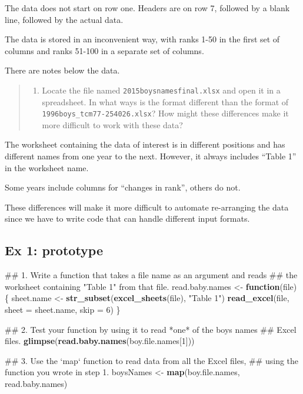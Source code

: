 \documentclass[]{book}
\newenvironment{Shaded}{\begin{snugshade}}{\end{snugshade}}
\newcommand{\KeywordTok}[1]{\textcolor[rgb]{0.13,0.29,0.53}{\textbf{#1}}}
\newcommand{\DataTypeTok}[1]{\textcolor[rgb]{0.13,0.29,0.53}{#1}}
\newcommand{\DecValTok}[1]{\textcolor[rgb]{0.00,0.00,0.81}{#1}}
\newcommand{\StringTok}[1]{\textcolor[rgb]{0.31,0.60,0.02}{#1}}
\newcommand{\ControlFlowTok}[1]{\textcolor[rgb]{0.13,0.29,0.53}{\textbf{#1}}}
\newcommand{\NormalTok}[1]{#1}
\providecommand{\tightlist}{%
  \setlength{\itemsep}{0pt}\setlength{\parskip}{0pt}}
\begin{document}
The data does not start on row one. Headers are on row 7, followed by a
blank line, followed by the actual data.

The data is stored in an inconvenient way, with ranks 1-50 in the first
set of columns and ranks 51-100 in a separate set of columns.

There are notes below the data.

\begin{quote}
\begin{enumerate}
\def\labelenumi{\arabic{enumi}.}
\setcounter{enumi}{2}
\tightlist
\item
  Locate the file named \texttt{2015boysnamesfinal.xlsx} and open it in
  a spreadsheet. In what ways is the format different than the format of
  \texttt{1996boys\_tcm77-254026.xlsx}? How might these differences make
  it more difficult to work with these data?
\end{enumerate}
\end{quote}

The worksheet containing the data of interest is in different positions
and has different names from one year to the next. However, it always
includes ``Table 1'' in the worksheet name.

Some years include columns for ``changes in rank'', others do not.

These differences will make it more difficult to automate re-arranging
the data since we have to write code that can handle different input
formats.

\subsection{Ex 1: prototype}\label{ex-1-prototype-3}

\begin{Shaded}
\begin{Highlighting}[]
\NormalTok{  ## 1. Write a function that takes a file name as an argument and reads}
\NormalTok{  ##    the worksheet containing "Table 1" from that file.}
\NormalTok{  read.baby.names <-}\StringTok{ }\ControlFlowTok{function}\NormalTok{(file) \{}
\NormalTok{      sheet.name <-}\StringTok{ }\KeywordTok{str_subset}\NormalTok{(}\KeywordTok{excel_sheets}\NormalTok{(file), }\StringTok{"Table 1"}\NormalTok{)}
      \KeywordTok{read_excel}\NormalTok{(file, }\DataTypeTok{sheet =}\NormalTok{ sheet.name, }\DataTypeTok{skip =} \DecValTok{6}\NormalTok{)}
\NormalTok{  \}}
  
\NormalTok{  ## 2. Test your function by using it to read *one* of the boys names}
\NormalTok{  ##    Excel files.}
  \KeywordTok{glimpse}\NormalTok{(}\KeywordTok{read.baby.names}\NormalTok{(boy.file.names[}\DecValTok{1}\NormalTok{]))}
     
\NormalTok{  ## 3. Use the `map` function to read data from all the Excel files,}
\NormalTok{  ##    using the function you wrote in step 1.}
\NormalTok{  boysNames <-}\StringTok{ }\KeywordTok{map}\NormalTok{(boy.file.names, read.baby.names)}
\end{Highlighting}
\end{Shaded}
\end{document}
